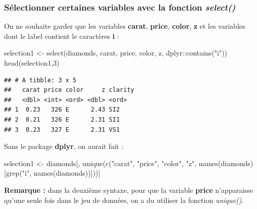 \documentclass[
]{book}
\newenvironment{Shaded}{\begin{snugshade}}{\end{snugshade}}
\newcommand{\DecValTok}[1]{\textcolor[rgb]{0.00,0.00,0.81}{#1}}
\newcommand{\FunctionTok}[1]{\textcolor[rgb]{0.00,0.00,0.00}{#1}}
\newcommand{\NormalTok}[1]{#1}
\newcommand{\OtherTok}[1]{\textcolor[rgb]{0.56,0.35,0.01}{#1}}
\newcommand{\SpecialCharTok}[1]{\textcolor[rgb]{0.00,0.00,0.00}{#1}}
\newcommand{\StringTok}[1]{\textcolor[rgb]{0.31,0.60,0.02}{#1}}
\theoremstyle{definition}
\theoremstyle{definition}
\theoremstyle{definition}
\theoremstyle{definition}
\theoremstyle{remark}
\begin{document}
\hypertarget{suxe9lectionner-certaines-variables-avec-la-fonction-select}{%
\subsubsection{\texorpdfstring{Sélectionner certaines variables avec la fonction \emph{select()}}{Sélectionner certaines variables avec la fonction select()}}\label{suxe9lectionner-certaines-variables-avec-la-fonction-select}}

On ne souhaite garder que les variables \textbf{carat}, \textbf{price}, \textbf{color}, \textbf{z} et les variables dont le label contient le caractères \textbf{i} :

\begin{Shaded}
\begin{Highlighting}[]
\NormalTok{selection1 }\OtherTok{\textless{}{-}} \FunctionTok{select}\NormalTok{(diamonds, carat, price, color, z, }
\NormalTok{                     dplyr}\SpecialCharTok{::}\FunctionTok{contains}\NormalTok{(}\StringTok{"i"}\NormalTok{))}
\FunctionTok{head}\NormalTok{(selection1,}\DecValTok{3}\NormalTok{)}
\end{Highlighting}
\end{Shaded}

\begin{verbatim}
## # A tibble: 3 x 5
##   carat price color     z clarity
##   <dbl> <int> <ord> <dbl> <ord>  
## 1  0.23   326 E      2.43 SI2    
## 2  0.21   326 E      2.31 SI1    
## 3  0.23   327 E      2.31 VS1
\end{verbatim}

Sans le package \textbf{dplyr}, on aurait fait :

\begin{Shaded}
\begin{Highlighting}[]
\NormalTok{selection1 }\OtherTok{\textless{}{-}}\NormalTok{ diamonds[, }\FunctionTok{unique}\NormalTok{(}\FunctionTok{c}\NormalTok{(}\StringTok{"carat"}\NormalTok{, }\StringTok{"price"}\NormalTok{, }\StringTok{"color"}\NormalTok{, }\StringTok{"z"}\NormalTok{, }
                                  \FunctionTok{names}\NormalTok{(diamonds)[}\FunctionTok{grep}\NormalTok{(}\StringTok{"i"}\NormalTok{, }\FunctionTok{names}\NormalTok{(diamonds))]))]}
\end{Highlighting}
\end{Shaded}

\textbf{Remarque :} dans la deuxième syntaxe, pour que la variable \textbf{price} n'apparaisse qu'une seule fois dans le jeu de données, on a du utiliser la fonction \emph{unique()}.
\end{document}
